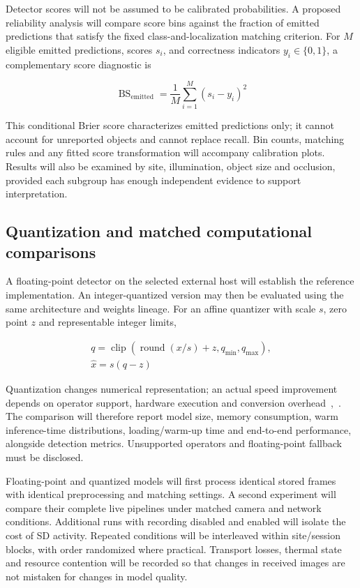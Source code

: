 \documentclass[11pt,letterpaper]{article}
\begin{document}
Detector scores will not be assumed to be calibrated probabilities. A proposed reliability analysis will compare score bins against the fraction of emitted predictions that satisfy the fixed class-and-localization matching criterion. For \(M\) eligible emitted predictions, scores \(s_i\), and correctness indicators \(y_i\in\{0,1\}\), a complementary score diagnostic is

\begin{equation}
\operatorname{BS}_{\mathrm{emitted}}
=\frac{1}{M}\sum_{i=1}^{M}(s_i-y_i)^2
\label{eq:31}
\end{equation}

This conditional Brier score characterizes emitted predictions only; it cannot account for unreported objects and cannot replace recall. Bin counts, matching rules and any fitted score transformation will accompany calibration plots. Results will also be examined by site, illumination, object size and occlusion, provided each subgroup has enough independent evidence to support interpretation.

\subsection{Quantization and matched computational comparisons}

A floating-point detector on the selected external host will establish the reference implementation. An integer-quantized version may then be evaluated using the same architecture and weights lineage. For an affine quantizer with scale \(s\), zero point \(z\) and representable integer limits,

\begin{equation}
\begin{gathered}q=\operatorname{clip}\!\left(\operatorname{round}(x/s)+z,q_{\min},q_{\max}\right),
\\
\hat x=s(q-z)\end{gathered}
\label{eq:32}
\end{equation}

Quantization changes numerical representation; an actual speed improvement depends on operator support, hardware execution and conversion overhead~\cite{ENG_QUANT},~\cite{ENG_ONNX}. The comparison will therefore report model size, memory consumption, warm inference-time distributions, loading/warm-up time and end-to-end performance, alongside detection metrics. Unsupported operators and floating-point fallback must be disclosed.

Floating-point and quantized models will first process identical stored frames with identical preprocessing and matching settings. A second experiment will compare their complete live pipelines under matched camera and network conditions. Additional runs with recording disabled and enabled will isolate the cost of SD activity. Repeated conditions will be interleaved within site/session blocks, with order randomized where practical. Transport losses, thermal state and resource contention will be recorded so that changes in received images are not mistaken for changes in model quality.
\end{document}
